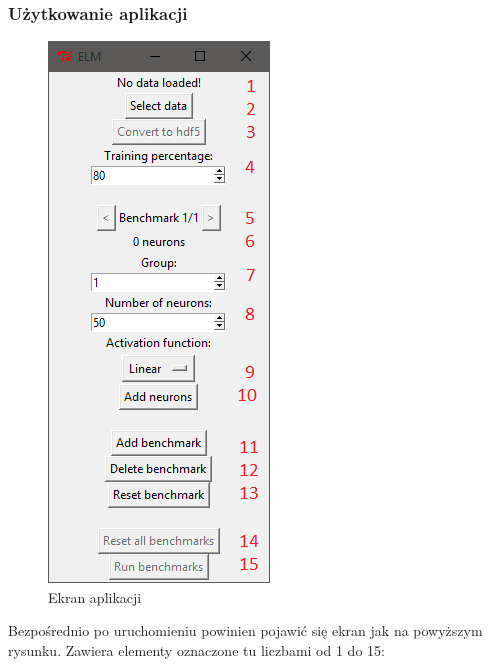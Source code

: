 \documentclass{article}
\begin{document}
\subsubsection*{Użytkowanie aplikacji}
\begin{figure}[H]
\centering
\includegraphics{instrukcja_python_start.png}
\caption{Ekran aplikacji}
\end{figure}
Bezpośrednio po uruchomieniu powinien pojawić się ekran jak na powyższym rysunku. Zawiera elementy oznaczone tu liczbami od 1 do 15:
\end{document}
